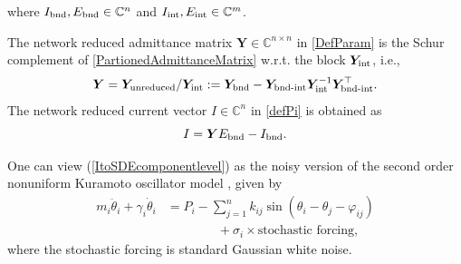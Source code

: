 \documentclass[10pt,twocolumn]{IEEEtran}
\begin{document}
where $I_{\rm{bnd}},E_{\rm{bnd}}\in\mathbb{C}^{n}$ and $I_{\rm{int}},E_{\rm{int}}\in\mathbb{C}^{m}$.

The network reduced admittance matrix $\bm{Y}\in\mathbb{C}^{n\times n}$ in \eqref{DefParam} is the Schur complement of \eqref{PartionedAdmittanceMatrix} w.r.t. the block $\bm{Y}_{\rm{int}}$, i.e.,
\[\bm{Y} = \bm{Y}_{\rm{unreduced}} / \bm{Y}_{\rm{int}} := \bm{Y}_{\rm{bnd}} - \bm{Y}_{\rm{bnd{\text{-}}int}} \bm{Y}_{\rm{int}}^{-1}\bm{Y}_{\rm{bnd{\text{-}}int}}^{\top}.\]
The network reduced current vector $I\in\mathbb{C}^{n}$ in \eqref{defPi} is obtained as
\[I  = \bm{Y}E_{\rm{bnd}} - I_{\rm{bnd}}.\]

One can view (\ref{ItoSDEcomponentlevel}) as the noisy version of the second order nonuniform Kuramoto oscillator model \cite{dorfler2012synchronization,rodrigues2016kuramoto}, given by
\begin{align}
m_{i}\ddot{\theta}_{i} + \gamma_{i}\dot{\theta}_{i} &= P_{i} - \displaystyle\sum_{j=1}^{n} k_{ij}\sin\left(\theta_{i} - \theta_{j} - \varphi_{ij}\right) \nonumber\\
&\qquad\qquad+ \sigma_{i} \times \text{stochastic forcing},
\label{LangevinForm}	
\end{align}
where the stochastic forcing is standard Gaussian white noise. 
\end{document}
